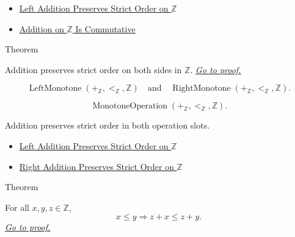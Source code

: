 \begin{dependencies}
\begin{itemize}
  \item \hyperref[thm:left-addition-preserves-strict-order-on-z]{Left Addition Preserves Strict Order on $\mathbb{Z}$}
  \item \hyperref[thm:addition-on-z-commutative]{Addition on $\mathbb{Z}$ Is Commutative}
\end{itemize}
\end{dependencies}

\begin{theorembox}{Theorem}
\begin{theorem}
\label{thm:addition-preserves-strict-order-on-z}
Addition preserves strict order on both sides in $\mathbb{Z}$.
\hyperref[prf:addition-preserves-strict-order-on-z]{\textit{Go to proof.}}
\end{theorem}
\end{theorembox}

\begin{remark*}
\[
\operatorname{LeftMonotone}(+_{\mathbb{Z}},<_{\mathbb{Z}},\mathbb{Z})
\quad\text{and}\quad
\operatorname{RightMonotone}(+_{\mathbb{Z}},<_{\mathbb{Z}},\mathbb{Z}).
\]
\end{remark*}

\begin{remark*}
\[
\operatorname{MonotoneOperation}(+_{\mathbb{Z}},<_{\mathbb{Z}},\mathbb{Z}).
\]
\end{remark*}

\begin{remark*}[Interpretation]
Addition preserves strict order in both operation slots.
\end{remark*}

\begin{dependencies}
\begin{itemize}
  \item \hyperref[thm:left-addition-preserves-strict-order-on-z]{Left Addition Preserves Strict Order on $\mathbb{Z}$}
  \item \hyperref[cor:right-addition-preserves-strict-order-on-z]{Right Addition Preserves Strict Order on $\mathbb{Z}$}
\end{itemize}
\end{dependencies}

\begin{theorembox}{Theorem}
\begin{theorem}
\label{thm:left-addition-preserves-order-on-z}
For all $x,y,z\in\mathbb{Z}$,
\[
x\le y \Longrightarrow z+x\le z+y.
\]
\hyperref[prf:left-addition-preserves-order-on-z]{\textit{Go to proof.}}
\end{theorem}
\end{theorembox}

